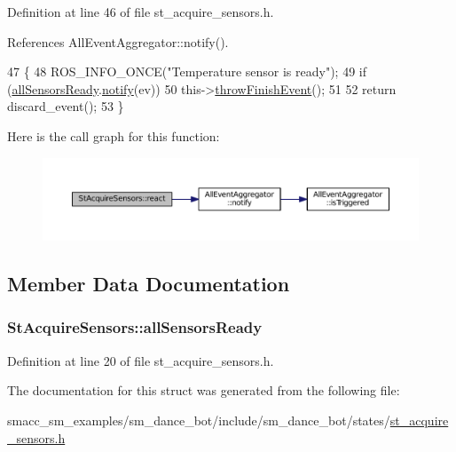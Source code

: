 Definition at line 46 of file st\+\_\+acquire\+\_\+sensors.\+h.



References All\+Event\+Aggregator\+::notify().


\begin{DoxyCode}
47    \{
48       ROS\_INFO\_ONCE(\textcolor{stringliteral}{"Temperature sensor is ready"});
49       \textcolor{keywordflow}{if} (\hyperlink{structStAcquireSensors_adc57ee1bdc2d1622b65811366f70845b}{allSensorsReady}.\hyperlink{classAllEventAggregator_aec3ce484f803c39cb1fddefb07611e45}{notify}(ev))
50          this->\hyperlink{classsmacc_1_1SmaccState_a56ccdfaf818ed6409dcbd4ab8b01c60e}{throwFinishEvent}();
51 
52       \textcolor{keywordflow}{return} discard\_event();
53    \}
\end{DoxyCode}


Here is the call graph for this function\+:
\nopagebreak
\begin{figure}[H]
\begin{center}
\leavevmode
\includegraphics[width=350pt]{structStAcquireSensors_af69db5f01143f5b9267fbd39fc566be8_cgraph}
\end{center}
\end{figure}




\subsection{Member Data Documentation}
\subsubsection[{\texorpdfstring{all\+Sensors\+Ready}{allSensorsReady}}]{ St\+Acquire\+Sensors\+::all\+Sensors\+Ready}\hypertarget{structStAcquireSensors_adc57ee1bdc2d1622b65811366f70845b}{}\label{structStAcquireSensors_adc57ee1bdc2d1622b65811366f70845b}


Definition at line 20 of file st\+\_\+acquire\+\_\+sensors.\+h.



The documentation for this struct was generated from the following file\+:\begin{DoxyCompactItemize}
\item 
smacc\+\_\+sm\+\_\+examples/sm\+\_\+dance\+\_\+bot/include/sm\+\_\+dance\+\_\+bot/states/\hyperlink{st__acquire__sensors_8h}{st\+\_\+acquire\+\_\+sensors.\+h}\end{DoxyCompactItemize}
